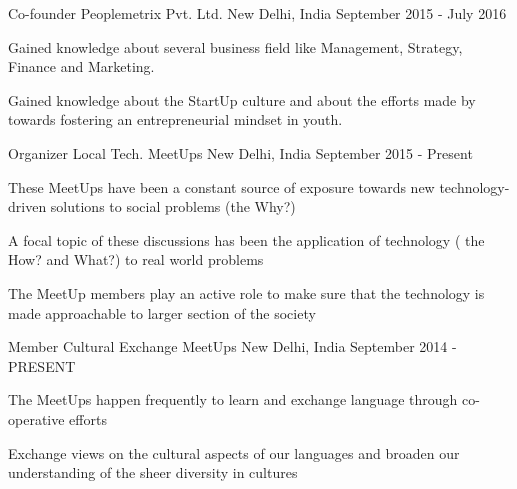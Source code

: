 \begin{cventries}
  \cventry
    {Co-founder}
    {Peoplemetrix Pvt. Ltd.}
    {New Delhi, India}
    {September 2015 - July 2016} 
    {
      \begin{cvitems}
        \item {Gained knowledge about several business field like Management, Strategy, Finance and Marketing.}
        \item {Gained knowledge about the StartUp culture and about the efforts
            made by towards fostering an entrepreneurial mindset in youth.}      
      \end{cvitems}
    }
  \cventry
    {Organizer}
    {Local Tech. MeetUps }
    {New Delhi, India}
    {September 2015 - Present}
    {
      \begin{cvitems}
        \item {These MeetUps have been a constant source of exposure towards new technology-driven solutions to social problems (the Why?) }
        \item {A focal topic of these discussions has been the application of technology ( the How? and What?) to real world problems}
        \item {The MeetUp members play an active role to make sure that the technology is made approachable to larger section of the society}
      \end{cvitems}
    }
  \cventry
    {Member}
    {Cultural Exchange MeetUps}
    {New Delhi, India}
    {September 2014 - PRESENT}
    {
      \begin{cvitems}
        \item {The MeetUps happen frequently to learn and exchange language through co-operative efforts}
        \item {Exchange views on the cultural aspects of our languages and broaden our understanding of the sheer diversity in cultures}
      \end{cvitems}
    }
\end{cventries}
